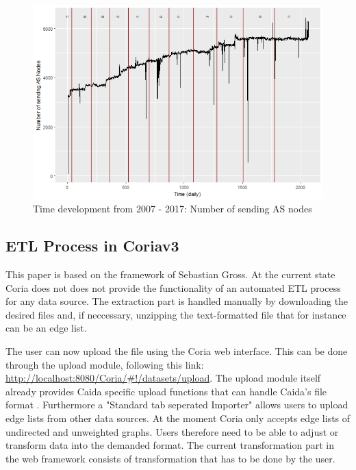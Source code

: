 \documentclass[conference, 11pt]{IEEEtran}
\begin{document}
\vspace{0.5cm}
\begin{figure}[htbp]
\centerline{\includegraphics[scale=0.4]{Graphics/ASFromAll.png}}
\caption{Time development from 2007 - 2017: Number of sending AS nodes}
\label{fig}
\end{figure}
\vspace{0.5cm}

\subsection{ETL Process in Coriav3}



This paper is based on the framework of Sebastian Gross\cite{Coria3}. At the current state Coria does not does not provide the functionality of an automated ETL process for any data source. The extraction part is handled manually by downloading the desired files and, if neccessary, unzipping the text-formatted file that for instance can be an edge list. \linebreak


The user can now upload the file using the Coria web interface. This can be done through the upload module, following this link: \url{http://localhost:8080/Coria/#!/datasets/upload}. The upload module itself already provides Caida specific upload functions that can handle Caida's file format \cite{Coria3}. Furthermore a "Standard tab seperated Importer" allows users to upload edge lists from other data sources. At the moment Coria only accepts edge lists of undirected and unweighted graphs. Users therefore need to be able to adjust or transform data into the demanded format. The current transformation part in the web framework consists of transformation that has to be done by the user.\linebreak
\end{document}
